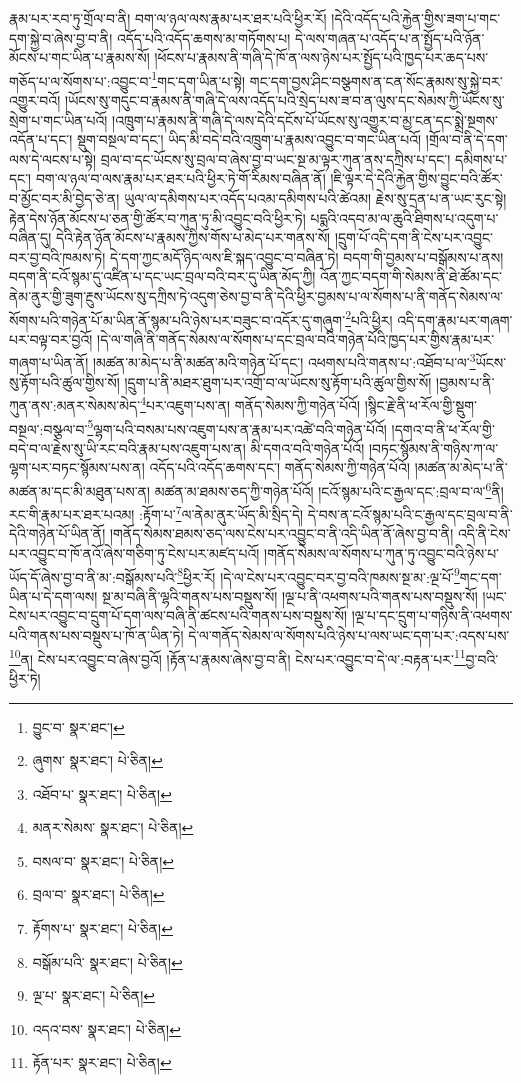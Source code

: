 རྣམ་པར་རབ་ཏུ་གྲོལ་བ་ནི། བག་ལ་ཉལ་ལས་རྣམ་པར་ཐར་པའི་ཕྱིར་རོ། །དེའི་འདོད་པའི་རྐྱེན་གྱིས་ཟག་པ་གང་དག་སྐྱེ་བ་ཞེས་བྱ་བ་ནི། འདོད་པའི་འདོད་ཆགས་མ་གཏོགས་པ། དེ་ལས་གཞན་པ་འདོད་པ་ན་སྤྱོད་པའི་ཉོན་མོངས་པ་གང་ཡིན་པ་རྣམས་སོ། །ཕོངས་པ་རྣམས་ནི་གཞི་དེ་ཁོ་ན་ལས་ཉེས་པར་སྤྱོད་པའི་ཁྱད་པར་ཆད་པས་གཅོད་པ་ལ་སོགས་པ་:འབྱུང་བ་\footnote{བྱུང་བ་  སྣར་ཐང་། }གང་དག་ཡིན་པ་སྟེ། གང་དག་བྱས་ཤིང་བསྩགས་ན་ངན་སོང་རྣམས་སུ་སྐྱེ་བར་འགྱུར་བའོ། །ཡོངས་སུ་གདུང་བ་རྣམས་ནི་གཞི་དེ་ལས་འདོད་པའི་སྲེད་པས་ཟ་བ་ན་ལུས་དང་སེམས་ཀྱི་ཡོངས་སུ་སྲེག་པ་གང་ཡིན་པའོ། །འཁྲུག་པ་རྣམས་ནི་གཞི་དེ་ལས་དེའི་དངོས་པོ་ཡོངས་སུ་འགྱུར་བ་མྱ་ངན་དང་སྨྲེ་སྔགས་འདོན་པ་དང་། སྡུག་བསྔལ་བ་དང་། ཡིད་མི་བདེ་བའི་འཁྲུག་པ་རྣམས་འབྱུང་བ་གང་ཡིན་པའོ། །གྲོལ་བ་ནི་དེ་དག་ལས་དེ་ལངས་པ་སྟེ། བྲལ་བ་དང་ཡོངས་སུ་བྲལ་བ་ཞེས་བྱ་བ་ཡང་སྔ་མ་ལྟར་ཀུན་ནས་དཀྲིས་པ་དང་། དམིགས་པ་དང་། བག་ལ་ཉལ་བ་ལས་རྣམ་པར་ཐར་པའི་ཕྱིར་ཏེ་གོ་རིམས་བཞིན་ནོ། །ཇི་ལྟར་དེ་དེའི་རྐྱེན་གྱིས་བྱུང་བའི་ཚོར་བ་མྱོང་བར་མི་བྱེད་ཅེ་ན། ཡུལ་ལ་དམིགས་པར་འདོད་པའམ་དམིགས་པའི་ཚེའམ། རྗེས་སུ་དྲན་པ་ན་ཡང་རུང་སྟེ། རྟེན་དེས་ཉོན་མོངས་པ་ཅན་གྱི་ཚོར་བ་ཀུན་ཏུ་མི་འབྱུང་བའི་ཕྱིར་ཏེ། པདྨའི་འདབ་མ་ལ་ཆུའི་ཐིགས་པ་འདུག་པ་བཞིན་དུ། དེའི་རྟེན་ཉོན་མོངས་པ་རྣམས་ཀྱིས་གོས་པ་མེད་པར་གནས་སོ། །དྲུག་པོ་འདི་དག་ནི་ངེས་པར་འབྱུང་བར་བྱ་བའི་ཁམས་ཏེ། དེ་དག་ཀྱང་མདོ་ཉིད་ལས་ཇི་སྐད་འབྱུང་བ་བཞིན་ཏེ། བདག་གི་བྱམས་པ་བསྒོམས་པ་ནས། བདག་ནི་ངའོ་སྙམ་དུ་འཛིན་པ་དང་ཡང་བྲལ་བའི་བར་དུ་ཡིན་མོད་ཀྱི། འོན་ཀྱང་བདག་གི་སེམས་ནི་ཐེ་ཚོམ་དང་ནེམ་ནུར་གྱི་ཟུག་རྔུས་ཡོངས་སུ་དཀྲིས་ཏེ་འདུག་ཅེས་བྱ་བ་ནི་དེའི་ཕྱིར་བྱམས་པ་ལ་སོགས་པ་ནི་གནོད་སེམས་ལ་སོགས་པའི་གཉེན་པོ་མ་ཡིན་ནོ་སྙམ་པའི་ཉེས་པར་བཟུང་བ་འདོར་དུ་གཞུག་\footnote{ཞུགས་  སྣར་ཐང་།  པེ་ཅིན། }པའི་ཕྱིར། འདི་དག་རྣམ་པར་གཞག་པར་བལྟ་བར་བྱའོ། །དེ་ལ་གཞི་ནི་གནོད་སེམས་ལ་སོགས་པ་དང་བྲལ་བའི་གཉེན་པོའི་ཁྱད་པར་གྱིས་རྣམ་པར་གཞག་པ་ཡིན་ནོ། །མཚན་མ་མེད་པ་ནི་མཚན་མའི་གཉེན་པོ་དང་། འཕགས་པའི་གནས་པ་:འཐོབ་པ་ལ་\footnote{འཐོབ་པ་  སྣར་ཐང་།  པེ་ཅིན། }ཡོངས་སུ་རྟོག་པའི་ཚུལ་གྱིས་སོ། །དྲུག་པ་ནི་མཐར་ཐུག་པར་འགྲོ་བ་ལ་ཡོངས་སུ་རྟོག་པའི་ཚུལ་གྱིས་སོ། །བྱམས་པ་ནི་ཀུན་ནས་:མནར་སེམས་མེད་\footnote{མནར་སེམས་  སྣར་ཐང་།  པེ་ཅིན། }པར་འཇུག་པས་ན། གནོད་སེམས་ཀྱི་གཉེན་པོའོ། །སྙིང་རྗེ་ནི་ཕ་རོལ་གྱི་སྡུག་བསྔལ་:བསྩལ་བ་\footnote{བསལ་བ་  སྣར་ཐང་།  པེ་ཅིན། }ལྷག་པའི་བསམ་པས་འཇུག་པས་ན་རྣམ་པར་འཚེ་བའི་གཉེན་པོའོ། །དགའ་བ་ནི་ཕ་རོལ་གྱི་བདེ་བ་ལ་རྗེས་སུ་ཡི་རང་བའི་རྣམ་པས་འཇུག་པས་ན། མི་དགའ་བའི་གཉེན་པོའོ། །བཏང་སྙོམས་ནི་གཉིས་ཀ་ལ་ལྷག་པར་བཏང་སྙོམས་པས་ན། འདོད་པའི་འདོད་ཆགས་དང་། གནོད་སེམས་ཀྱི་གཉེན་པོའོ། །མཚན་མ་མེད་པ་ནི་མཚན་མ་དང་མི་མཐུན་པས་ན། མཚན་མ་ཐམས་ཅད་ཀྱི་གཉེན་པོའོ། །ངའོ་སྙམ་པའི་ང་རྒྱལ་དང་:བྲལ་བ་ལ་\footnote{བྲལ་བ་  སྣར་ཐང་།  པེ་ཅིན། }ནི། རང་གི་རྣམ་པར་ཐར་པའམ། :རྟོག་པ་\footnote{རྟོགས་པ་  སྣར་ཐང་།  པེ་ཅིན། }ལ་ནེམ་ནུར་ཡོད་མི་སྲིད་དེ། དེ་བས་ན་ངའོ་སྙམ་པའི་ང་རྒྱལ་དང་བྲལ་བ་ནི་དེའི་གཉེན་པོ་ཡིན་ནོ། །གནོད་སེམས་ཐམས་ཅད་ལས་ངེས་པར་འབྱུང་བ་ནི་འདི་ཡིན་ནོ་ཞེས་བྱ་བ་ནི། འདི་ནི་ངེས་པར་འབྱུང་བ་ཁོ་ནའོ་ཞེས་གཅིག་ཏུ་ངེས་པར་མཛད་པའོ། །གནོད་སེམས་ལ་སོགས་པ་ཀུན་ཏུ་འབྱུང་བའི་ཉེས་པ་ཡོད་དོ་ཞེས་བྱ་བ་ནི་མ་:བསྒོམས་པའི་\footnote{བསྒོམ་པའི་  སྣར་ཐང་།  པེ་ཅིན། }ཕྱིར་རོ། །དེ་ལ་ངེས་པར་འབྱུང་བར་བྱ་བའི་ཁམས་སྔ་མ་:ལྔ་པོ་\footnote{ལྔ་པ་  སྣར་ཐང་།  པེ་ཅིན། }གང་དག་ཡིན་པ་དེ་དག་ལས། སྔ་མ་བཞི་ནི་ལྷའི་གནས་པས་བསྡུས་སོ། །ལྔ་པ་ནི་འཕགས་པའི་གནས་པས་བསྡུས་སོ། །ཡང་ངེས་པར་འབྱུང་བ་དྲུག་པོ་དག་ལས་བཞི་ནི་ཚངས་པའི་གནས་པས་བསྡུས་སོ། །ལྔ་པ་དང་དྲུག་པ་གཉིས་ནི་འཕགས་པའི་གནས་པས་བསྡུས་པ་ཁོ་ན་ཡིན་ཏེ། དེ་ལ་གནོད་སེམས་ལ་སོགས་པའི་ཉེས་པ་ལས་ཡང་དག་པར་:འདས་པས་\footnote{འདའ་བས་  སྣར་ཐང་།  པེ་ཅིན། }ན། ངེས་པར་འབྱུང་བ་ཞེས་བྱའོ། །རྟོན་པ་རྣམས་ཞེས་བྱ་བ་ནི། ངེས་པར་འབྱུང་བ་དེ་ལ་:བརྟན་པར་\footnote{རྟོན་པར་  སྣར་ཐང་།  པེ་ཅིན། }བྱ་བའི་ཕྱིར་ཏེ། 